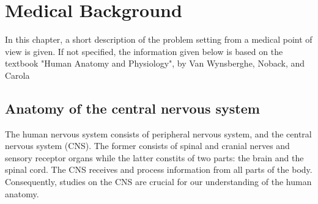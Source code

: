 \chapter{Medical Background}
In this chapter, a short description of the problem setting from a medical point of view is given. If not specified, the information given below is based on the textbook "Human Anatomy and Physiology", by Van Wynsberghe, Noback, and Carola \cite{VanW95}
\section{Anatomy of the central nervous system}
The human nervous system consists of peripheral nervous system, and the central nervous system (CNS). The former consists of spinal and cranial nerves and sensory receptor organs while the latter constits of two parts: the brain and the spinal cord. The CNS receives and process information from all parts of the body. Consequently, studies on the CNS are crucial for our understanding of the human anatomy.
